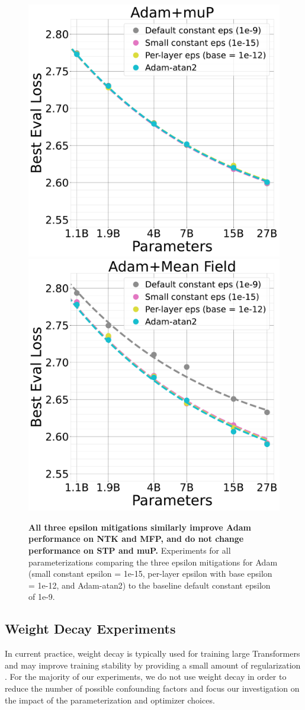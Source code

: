 \begin{figure}[ht]
\begin{center}
        \includegraphics[width=0.48\linewidth, trim={0, 0, 0, 0},clip]{icml2024/figures/epsilon/mup_epsilon_eval_loss_comparisons_zoom6.pdf}
        \hfill
        \includegraphics[width=0.48\linewidth, trim={0, 0, 0, 0},clip]{icml2024/figures/epsilon/mfp_epsilon_eval_loss_comparisons_zoom6.pdf}
       
       
        \caption{\textbf{All three epsilon mitigations similarly improve Adam performance on NTK and MFP, and do not change performance on STP and muP.} Experiments for all parameterizations comparing the three epsilon mitigations for Adam (small constant epsilon = 1e-15, per-layer epsilon with base epsilon = 1e-12, and Adam-atan2) to the baseline default constant epsilon of 1e-9.}
        \label{fig:epsilon_appendix_scaling_plots}
        \vspace{-24pt}
    \end{center}
\end{figure}
\clearpage

\subsection{Weight Decay Experiments}
\label{app:weight_decay}
In current practice, weight decay is typically used for training large Transformers and may improve training stability by providing a small amount of regularization \citep{brown2020gpt3}. For the majority of our experiments, we do not use weight decay in order to reduce the number of possible confounding factors and focus our investigation on the impact of the parameterization and optimizer choices.

